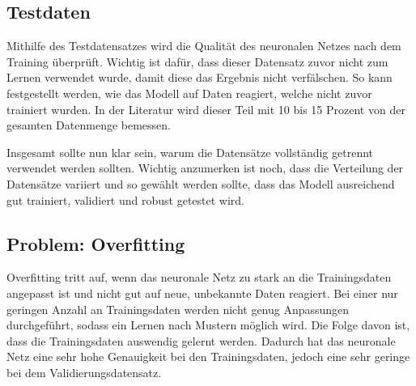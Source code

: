 \subsection{Testdaten}
Mithilfe des Testdatensatzes wird die Qualität des neuronalen Netzes nach dem Training überprüft. Wichtig ist dafür, dass dieser Datensatz zuvor nicht zum Lernen verwendet wurde, 
damit diese das Ergebnis nicht verfälschen.
So kann festgestellt werden, wie das Modell auf Daten reagiert, welche nicht zuvor trainiert wurden.
In der Literatur wird dieser Teil mit 10 bis 15 Prozent von der gesamten Datenmenge bemessen.


Insgesamt sollte nun klar sein, warum die Datensätze vollständig getrennt verwendet werden sollten. 
Wichtig anzumerken ist noch, dass die Verteilung der Datensätze variiert und so gewählt werden sollte, dass das Modell ausreichend gut trainiert, validiert und robust getestet wird.

\subsection{Problem: Overfitting}
Overfitting tritt auf, wenn das neuronale Netz zu stark an die Trainingsdaten angepasst ist und nicht gut auf neue, unbekannte Daten reagiert. 
Bei einer nur geringen Anzahl an Trainingsdaten werden nicht genug Anpassungen durchgeführt, sodass ein Lernen nach Mustern möglich wird. Die Folge davon ist, dass die Trainingsdaten auswendig gelernt werden.
Dadurch hat das neuronale Netz eine sehr hohe Genauigkeit bei den Trainingsdaten, jedoch eine sehr geringe bei dem Validierungsdatensatz. 